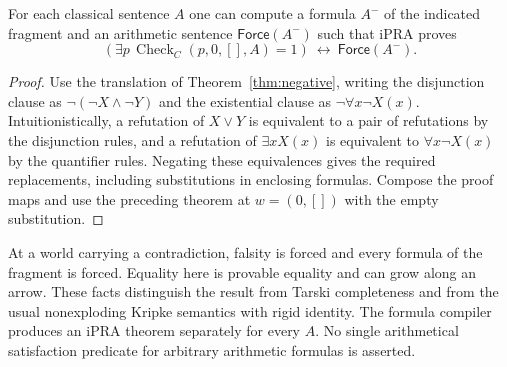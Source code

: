 \begin{corollary}
For each classical sentence $A$ one can compute a formula $A^-$ of the indicated fragment and an arithmetic sentence $\mathsf{Force}(A^-)$ such that iPRA proves
\[
       (\exists p\,\operatorname{Check}_C(p,0,[],A)=1)
                   \ \longleftrightarrow\ \mathsf{Force}(A^-).
\]
\end{corollary}
\begin{proof}
Use the translation of Theorem~\ref{thm:negative}, writing the disjunction clause as $\neg(\neg X\wedge\neg Y)$ and the existential clause as $\neg\forall x\neg X(x)$. Intuitionistically, a refutation of $X\vee Y$ is equivalent to a pair of refutations by the disjunction rules, and a refutation of $\exists x X(x)$ is equivalent to $\forall x\neg X(x)$ by the quantifier rules. Negating these equivalences gives the required replacements, including substitutions in enclosing formulas. Compose the proof maps and use the preceding theorem at $w=(0,[])$ with the empty substitution.
\end{proof}

At a world carrying a contradiction, falsity is forced and every formula of the fragment is forced. Equality here is provable equality and can grow along an arrow. These facts distinguish the result from Tarski completeness and from the usual nonexploding Kripke semantics with rigid identity. The formula compiler produces an iPRA theorem separately for every $A$. No single arithmetical satisfaction predicate for arbitrary arithmetic formulas is asserted.

